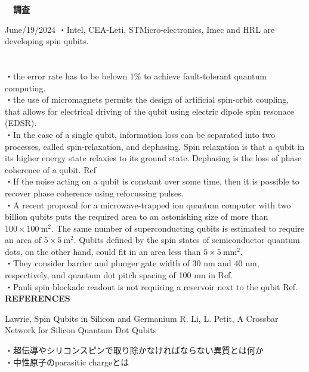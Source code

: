 \documentclass[a4paper,10.5pt]{ltjsarticle}
\begin{document}
\centerline
{\huge \bfseries　調査}
\rightline
{June/19/2024}
\leftline
{}
・Intel, CEA-Leti, STMicro-electronics, Imec and HRL are developing spin qubits.\\
\\
\\
・the error rate has to be belown 1\% to achieve fault-tolerant quantum computing.\\
・the use of micromagnets permits the design of artificial spin-orbit coupling, that allows for electrical driving of the qubit using electric dipole spin resonace (EDSR).\\
・In the case of a single qubit, information loss can be separated into two processes, called spin-relaxation, and dephasing. Spin relaxation is that a qubit in its higher energy state relaxies to its ground state. Dephasing  is the loss of phase coherence of a qubit. Ref\cite{1}\\
・If the noise acting on a qubit is constant over some time, then it is possible to recover phase coherence using refocussing pulses.\\
・A recent proposal for a microwave-trapped ion quantum computer with two billion qubits puts the required area to an astonishing size of more than $100\times100\ \mathrm{m^2}$. The same number of superconducting qubits is estimated to require an area of $5\times5\ \mathrm{m^2}$. Qubits defined by the spin states of semiconductor quantum dots, on the other hand, could fit in an area less than $5\times5\ \mathrm{mm^2}$.\\
・They consider barrier and plunger gate width of 30 nm and 40 nm, respectively, and quantum dot pitch spacing of 100 nm in Ref\cite{2}.\\
・Pauli spin blockade readout is not requiring a reservoir next to the qubit Ref\cite{2}.\\
\clearpage
{\Large \bfseries REFERENCES}
\begin{thebibliography}{1}
\vspace{-1.5cm}
   Lawrie, Spin Qubits in Silicon and Germanium
   R. Li, L. Petit, A Crossbar Network for Silicon Quantum Dot Qubits
\end{thebibliography}
\vspace{50pt}
・超伝導やシリコンスピンで取り除かなければならない異質とは何か\\
・中性原子のparasitic chargeとは\\
\end{document}
